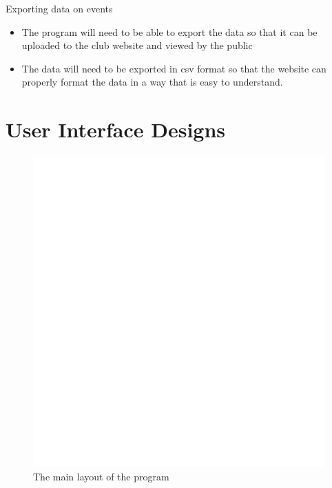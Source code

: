 Exporting data on events
\begin{itemize}
	\item The program will need to be able to export the data so that it can be uploaded to the club website and viewed by the public
	\item The data will need to be exported in csv format so that the website can properly format the data in a way that is easy to understand.
\end{itemize}

\section{User Interface Designs}
\begin{figure}[H]
	\includegraphics[width=\textwidth]{./UIDesign/BaseMainDrop.pdf}
	\caption{The main layout of the program} \label{fig:The main layout of the program} 	
\end{figure}

